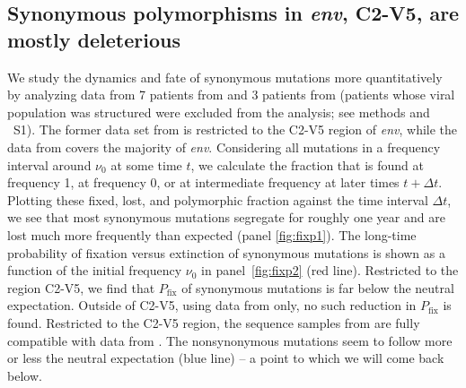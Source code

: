 \documentclass[rmp, twocolumn]{revtex4}
\newcommand{\pfix}{P_{\mathrm{fix}}}
\newcommand{\env}{\textit{env}}
\newcommand{\shankaregion}{C2-V5}
\newcommand{\PCApat}{1}
\begin{document}
\subsection{Synonymous polymorphisms in \env, \shankaregion, are mostly deleterious}
We study the dynamics and fate of synonymous mutations more quantitatively by
analyzing data from 7 patients from
\citet{shankarappa_consistent_1999,liu_selection_2006} and 3 patients from
\citet{bunnik_autologous_2008} (patients whose viral population was structured
were excluded from the analysis; see methods and \figurename~S\PCApat).  The
former data set from is restricted to the \shankaregion{} region of \env, while
the data from \citet{bunnik_autologous_2008} covers the majority of \env.
Considering all mutations in a frequency interval around $\nu_0$ at some time
$t$, we calculate the fraction that is found at frequency 1, at frequency 0, or
at intermediate frequency at later times $t+\Delta t$. Plotting these fixed,
lost, and polymorphic fraction against the time interval $\Delta t$, we see that
most synonymous mutations segregate for roughly one year and are lost much more
frequently than expected (panel \ref{fig:fixp1}). The long-time probability of
fixation versus extinction of synonymous mutations is shown as a function of the
initial frequency $\nu_0$ in panel~\ref{fig:fixp2} (red line). Restricted to the
region \shankaregion, we find that $\pfix$ of synonymous mutations is far below
the neutral expectation.  Outside of \shankaregion, using data from
\citet{bunnik_autologous_2008} only, no such reduction in $\pfix$ is found.
Restricted to the \shankaregion{} region, the sequence samples from
\citet{bunnik_autologous_2008} are fully compatible with data from
\citet{shankarappa_consistent_1999}. The nonsynonymous mutations seem to follow
more or less the neutral expectation (blue line) -- a point to which we will
come back below.
\end{document}
